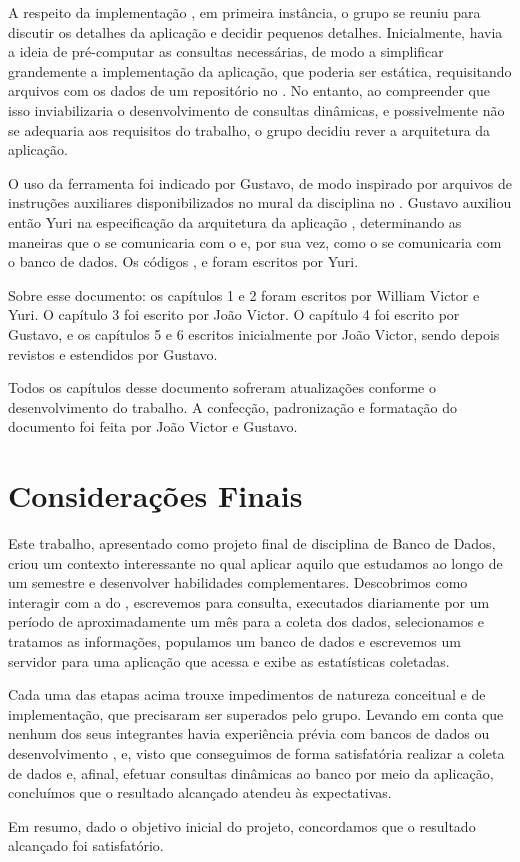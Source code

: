    A respeito da implementação , em primeira instância, o grupo se reuniu para discutir os detalhes da aplicação 
   e decidir pequenos detalhes. Inicialmente, havia a ideia de pré-computar as consultas necessárias, de modo a simplificar
   grandemente a implementação da aplicação, que poderia ser estática, requisitando arquivos  com os dados de um
   repositório no . No entanto, ao compreender que isso inviabilizaria o desenvolvimento de consultas dinâmicas,
   e possivelmente não se adequaria aos requisitos do trabalho, o grupo decidiu rever a arquitetura da aplicação.

   O uso da ferramenta  foi indicado por Gustavo, de modo inspirado por arquivos de instruções auxiliares
   disponibilizados no mural da disciplina no . Gustavo auxiliou então Yuri na especificação da
   arquitetura da aplicação , determinando as maneiras que o  se comunicaria com o
    e, por sua vez, como o  se comunicaria com o banco de dados.
   Os códigos ,  e  foram escritos por Yuri.

    Sobre esse documento: os capítulos 1 e 2 foram escritos por William Victor e Yuri.
    O capítulo 3 foi escrito por João Victor.
    O capítulo 4 foi escrito por Gustavo, e os capítulos 5 e 6 escritos inicialmente por João Victor,
    sendo depois revistos e estendidos por Gustavo.

    Todos os capítulos desse documento sofreram atualizações conforme o desenvolvimento do trabalho. A confecção, padronização
    e formatação do documento foi feita por João Victor e Gustavo.

\chapter{Considerações Finais}

   Este trabalho, apresentado como projeto final de disciplina de Banco de Dados, criou um contexto interessante no qual
   aplicar aquilo que estudamos ao longo de um semestre e desenvolver habilidades complementares.
   Descobrimos como interagir com a  do , escrevemos  para consulta, executados diariamente
   por um período de aproximadamente um mês para a coleta dos dados, selecionamos e tratamos as informações,
   populamos um banco de dados  e escrevemos um servidor para uma aplicação  que acessa e exibe
   as estatísticas coletadas.

   Cada uma das etapas acima trouxe impedimentos de natureza conceitual e de implementação, que precisaram ser superados pelo
   grupo. Levando em conta que nenhum dos seus
   integrantes havia experiência prévia com bancos de dados ou desenvolvimento , e, visto que conseguimos
   de forma satisfatória realizar a coleta de dados e, afinal, efetuar consultas dinâmicas ao banco por meio da aplicação,
   concluímos que o resultado alcançado atendeu às expectativas.

   Em resumo, dado o objetivo inicial do projeto, concordamos que o resultado alcançado foi satisfatório.
   
